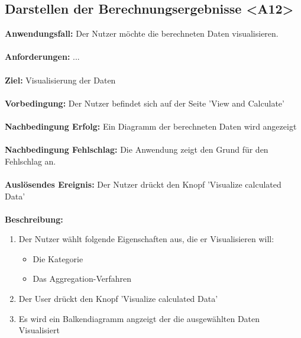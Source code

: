 \documentclass[parskip=full]{scrartcl} %
\begin{document}
\subsection*{Darstellen der Berechnungsergebnisse <A12>}
\textbf{Anwendungsfall:} Der Nutzer möchte die berechneten Daten visualisieren.\\\\
\textbf{Anforderungen:} ...\\\\
\textbf{Ziel:} Visualisierung der Daten\\\\
\textbf{Vorbedingung:}  Der Nutzer befindet sich auf der Seite 'View and Calculate'\\\\
\textbf{Nachbedingung Erfolg:} Ein Diagramm der berechneten Daten wird angezeigt \\\\
\textbf{Nachbedingung Fehlschlag:} Die Anwendung zeigt den Grund für den Fehlschlag an.\\\\
\textbf{Auslösendes Ereignis:} Der Nutzer drückt den Knopf 'Visualize calculated Data' \\\\
\textbf{Beschreibung:}
\begin{enumerate}
    \item Der Nutzer wählt folgende Eigenschaften aus, die er Visualisieren will:
    \begin{itemize}
        \item Die Kategorie
        \item Das Aggregation-Verfahren
    \end{itemize}
    \item Der User drückt den Knopf 'Visualize calculated Data'
    \item Es wird ein Balkendiagramm angzeigt der die ausgewählten Daten Visualisiert
\end{enumerate}
\newpage
\end{document}
